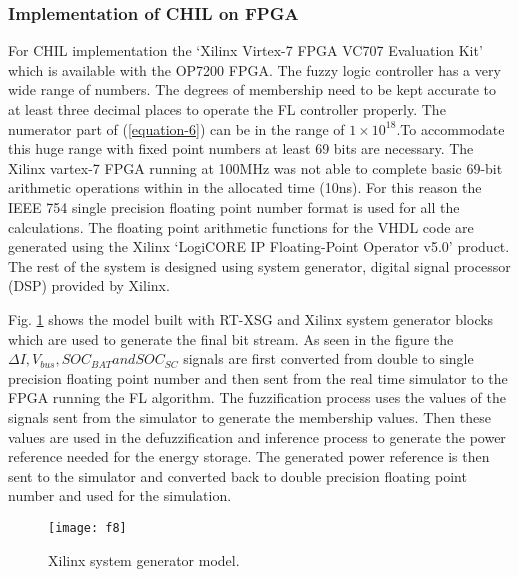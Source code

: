 \subsubsection{Implementation of CHIL on FPGA}
For CHIL implementation the ‘Xilinx Virtex-7 FPGA VC707 Evaluation Kit’ which is available with the OP7200 FPGA. The fuzzy logic controller has a very wide range of numbers. The degrees of membership need to be kept accurate to at least three decimal places to operate the FL controller properly. The numerator part of (\ref{equation-6}) can be in the range of $1 \times 10^{18}$.To accommodate this huge range with fixed point numbers at least 69 bits are necessary. The Xilinx vartex-7 FPGA running at 100MHz was not able to complete basic 69-bit arithmetic operations within in the allocated time (10ns).  For this reason the IEEE 754 single precision floating point number format \cite{sites2008ieee} is used for all the calculations. The floating point arithmetic functions for the VHDL code are generated using the Xilinx ‘LogiCORE IP Floating-Point Operator v5.0’ product. The rest of the system is designed using system generator, digital signal processor (DSP) provided by Xilinx.

Fig. \ref{sec4_f8} shows the model built with RT-XSG and Xilinx system generator blocks which are used to generate the final bit stream. As seen in the figure the $\Delta I, V_{bus}, SOC_{BAT} and SOC_{SC}$ signals are first converted from double to single precision floating point number  and then sent from the real time simulator to the FPGA running the FL algorithm. The fuzzification process uses the values of the signals sent from the simulator to generate the membership values. Then these values are used in the defuzzification and inference process to generate the power reference needed for the energy storage. The generated power reference is then sent to the simulator and converted back to double precision floating point number and used for the simulation.   
\begin{figure}[ht!]
\centering
\texttt{[image: f8]}
\caption{Xilinx system generator model.}
\label{sec4_f8}
\end{figure}

